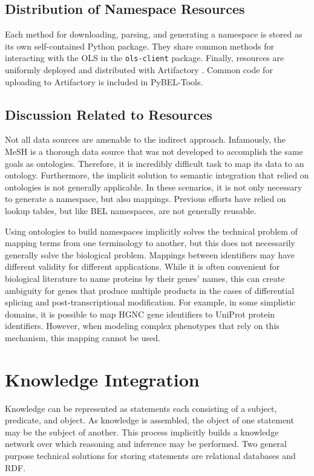 \subsection{Distribution of Namespace Resources}

Each method for downloading, parsing, and generating a namespace is stored as its own self-contained Python package. They share common methods for interacting with the \ac{OLS} in the \verb|ols-client| package. Finally, resources are uniformly deployed and distributed with Artifactory \cite{artifactory}. Common code for uploading to Artifactory is included in PyBEL-Tools. 

\subsection{Discussion Related to Resources}

Not all data sources are amenable to the indirect approach. Infamously, the \ac{MeSH} is a thorough data source that was not developed to accomplish the same goals as ontologies. Therefore, it is incredibly difficult task to map its data to an ontology. Furthermore, the implicit solution to semantic integration that relied on ontologies is not generally applicable. In these scenarios, it is not only necessary to generate a namespace, but also mappings. Previous efforts have relied on lookup tables, but like BEL namespaces, are not generally reusable.

Using ontologies to build namespaces implicitly solves the technical problem of mapping terms from one terminology to another, but this does not necessarily generally solve the biological problem. Mappings between identifiers may have different validity for different applications. While it is often convenient for biological literature to name proteins by their genes' names, this can create ambiguity for genes that produce multiple products in the cases of differential splicing and post-transcriptional modification. For example, in some simplistic domains, it is possible to map HGNC gene identifiers to \ac{UniProt} protein identifiers. However, when modeling complex phenotypes that rely on this mechanism, this mapping cannot be used.

\section{Knowledge Integration}

Knowledge can be represented as statements each consisting of a subject, predicate, and object. As knowledge is assembled, the object of one statement may be the subject of another. This process implicitly builds a knowledge network over which reasoning and inference may be performed. Two general purpose technical solutions for storing statements are relational databases and \ac{RDF}.

